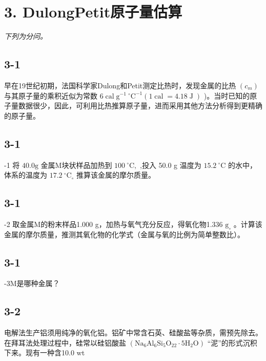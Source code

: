 \section*{3. DulongPetit原子量估算}
\textit{下列为分问。}

\subsection*{3-1}
早在19世纪初期，法国科学家Dulong和Petit测定⽐热时，发现⾦属的⽐热 $\left( c _ { m } \right)$ 与其原⼦量的乘积近似为常数 $6 \operatorname { c a l } \mathrm { g } ^ { - 1 } \ { } ^ { \circ } \mathrm { C } ^ { - 1 } \left( 1 \operatorname { c a l } = 4 . 1 8 \operatorname { J } \right)$ )。当时已知的原⼦量数据很少，因此，可利⽤⽐热推算原⼦量，进⽽采⽤其他⽅法分析得到更精确的原⼦量。

\subsection*{3-1}
-1 将 $4 0 . 0 \mathrm { g }$ ⾦属M块状样品加热到 $1 0 0 \ ^ { \circ } \mathrm { C } ,$ ,投⼊ 50.0 g 温度为 $1 5 . 2 ~ ^ { \circ } \mathrm { C }$ 的⽔中，体系的温度为 $1 7 . 2 ~ ^ { \circ } \mathrm { C } _ { \circ }$ 推算该⾦属的摩尔质量。

\subsection*{3-1}
-2 取⾦属M的粉末样品1.000 g，加热与氧⽓充分反应，得氧化物1.336 ${ \mathrm { g } } _ { \circ }$ 。计算该⾦属的摩尔质量，推测其氧化物的化学式（⾦属与氧的⽐例为简单整数⽐）。

\subsection*{3-1}
-3M是哪种⾦属？

\subsection*{3-2}
电解法⽣产铝须⽤纯净的氧化铝。铝矿中常含⽯英、硅酸盐等杂质，需预先除去。在拜耳法处理过程中，硅常以硅铝酸盐 $( \mathrm { N a _ { 6 } A l _ { 6 } S i _ { 5 } O _ { 2 2 } { \cdot } 5 H _ { 2 } O } )$ “泥”的形式沉积下来。现有⼀种含10.0 wt%
